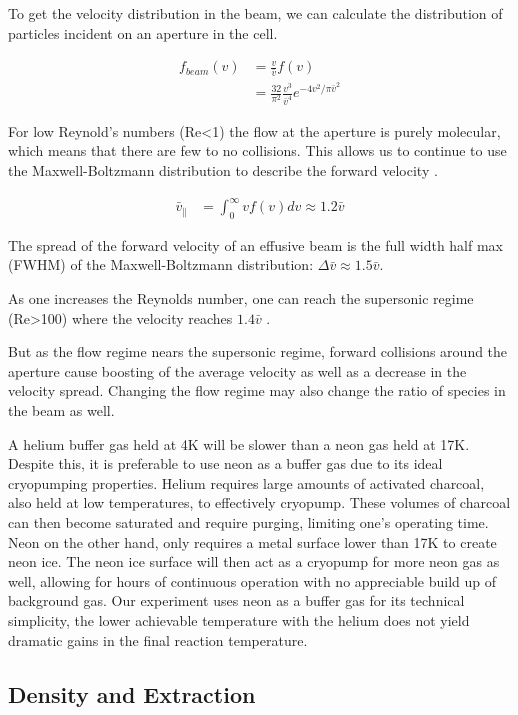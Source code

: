 To get the velocity distribution in the beam, we can calculate the distribution of particles incident on an aperture in the cell.

\begin{align}
f_{beam}(v) & = \frac{v}{\bar{v}}f(v)  \\
& = \frac{32}{\pi^2} \frac{v^3}{\bar{v}^4} e^{-4v^2/\pi \bar{v}^2}
\end{align}

For low Reynold's numbers (Re<1) the flow at the aperture is purely molecular, which means that there are few to no collisions. This allows us to continue to use the Maxwell-Boltzmann distribution to describe the forward velocity \cite{Hutzler2011c}.

\begin{align}
\bar{v}_\parallel & = \int_0^\infty v f(v) dv \approx 1.2 \bar{v}
\end{align}

The spread of the forward velocity of an effusive beam is the full width half max (FWHM) of the Maxwell-Boltzmann distribution: $\Delta\bar{v} \approx 1.5 \bar{v}$.

As one increases the Reynolds number, one can reach the supersonic regime (Re>100) where the velocity reaches $1.4\bar{v}$ \cite{Hutzler2011c}.

But as the flow regime nears the supersonic regime, forward collisions around the aperture cause boosting of the average velocity as well as a decrease in the velocity spread. Changing the flow regime may also change the ratio of species in the beam as well.

A helium buffer gas held at 4K will be slower than a neon gas held at 17K. Despite this, it is preferable to use neon as a buffer gas due to its ideal cryopumping properties. Helium requires large amounts of activated charcoal, also held at low temperatures, to effectively cryopump. These volumes of charcoal can then become saturated and require purging, limiting one's operating time. Neon on the other hand, only requires a metal surface lower than 17K to create neon ice. The neon ice surface will then act as a cryopump for more neon gas as well, allowing for hours of continuous operation with no appreciable build up of background gas. Our experiment uses neon as a buffer gas for its technical simplicity, the lower achievable temperature with the helium does not yield dramatic gains in the final reaction temperature.

\subsection{Density and Extraction}

